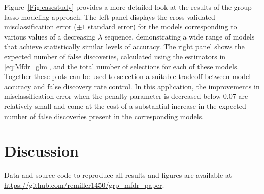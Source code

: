 Figure~\ref{Fig:casestudy} provides a more detailed look at the results of the group lasso modeling approach.  The left panel displays the cross-validated misclassification error ($\pm 1$ standard error) for the models corresponding to various values of a decreasing $\lambda$ sequence, demonstrating a wide range of models that achieve statistically similar levels of accuracy.  The right panel shows the expected number of false discoveries, calculated using the estimators in \ref{eq:Mfdr_glm}, and the total number of selections for each of these models.  Together these plots can be used to selection a suitable tradeoff between model accuracy and false discovery rate control.  In this application, the improvements in misclassification error when the penalty parameter is decreased below 0.07 are relatively small and come at the cost of a substantial increase in the expected number of false discoveries present in the corresponding models.

\section{Discussion}

\bigskip


\noindent Data and source code to reproduce all results and figures are available at \url{https://github.com/remiller1450/grp_mfdr_paper}.